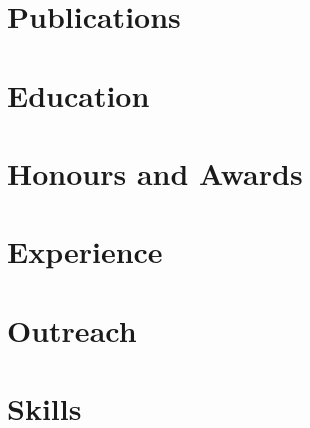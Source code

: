 \documentclass[english,a4paper,10pt,roman]{article}
\begin{document}
\thispagestyle{firstpage}



\section{Publications}


\section{Education}


\section{Honours and Awards}


\section{Experience}


\newpage
\section{Outreach}


\section{Skills}


\end{document}
